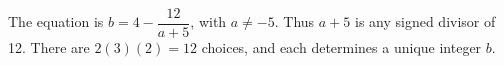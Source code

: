 The equation is $b=4-\dfrac{12}{a+5}$, with $a\ne-5$. Thus $a+5$ is any signed divisor of 12. There are $2(3)(2)=\boxed{12}$ choices, and each determines a unique integer $b$.
